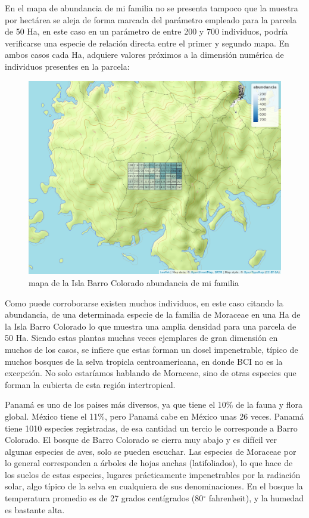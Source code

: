 \documentclass[11pt,]{article}
\begin{document}
En el mapa de abundancia de mi familia no se presenta tampoco que la
muestra por hectárea se aleja de forma marcada del parámetro empleado
para la parcela de 50 Ha, en este caso en un parámetro de entre 200 y
700 individuos, podría verificarse una especie de relación directa entre
el primer y segundo mapa. En ambos casos cada Ha, adquiere valores
próximos a la dimensión numérica de individuos presentes en la parcela:

\begin{figure}
\centering
\includegraphics[width=1.00000\textwidth]{mapa_cuadros_abun_mi_familia.png}
\caption{mapa de la Isla Barro Colorado abundancia de mi familia
\label{fig:bci_map}}
\end{figure}

Como puede corroborarse existen muchos individuos, en este caso citando
la abundancia, de una determinada especie de la familia de Moraceae en
una Ha de la Isla Barro Colorado lo que muestra una amplia densidad para
una parcela de 50 Ha. Siendo estas plantas muchas veces ejemplares de
gran dimensión en muchos de los casos, se infiere que estas forman un
dosel impenetrable, típico de muchos bosques de la selva tropicla
centroamericana, en donde BCI no es la excepción. No solo estaríamos
hablando de Moraceae, sino de otras especies que forman la cubierta de
esta región intertropical.

Panamá es uno de los paises más diversos, ya que tiene el 10\% de la
fauna y flora global. México tiene el 11\%, pero Panamá cabe en México
unas 26 veces. Panamá tiene 1010 especies registradas, de esa cantidad
un tercio le corresponde a Barro Colorado. El bosque de Barro Colorado
se cierra muy abajo y es difícil ver algunas especies de aves, solo se
pueden escuchar. Las especies de Moraceae por lo general corresponden a
árboles de hojas anchas (latifoliados), lo que hace de los suelos de
estas especies, lugares prácticamente impenetrables por la radiación
solar, algo típico de la selva en cualquiera de sus denominaciones. En
el bosque la temperatura promedio es de 27 grados centígrados
(80\(^\circ\) fahrenheit), y la humedad es bastante alta.
\end{document}
